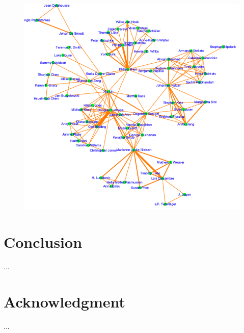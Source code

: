 \documentclass[runningheads,a4paper]{llncs}
\begin{document}
\begin{figure}
\centering
\includegraphics[width=0.7\linewidth]{network}
\caption{}
\label{fig:network}
\end{figure}



\section{Conclusion}\label{concl}
...%

\section{Acknowledgment}\label{sec:ACKNOWLEDGMENTS}
...

\newpage

 
\end{document}
